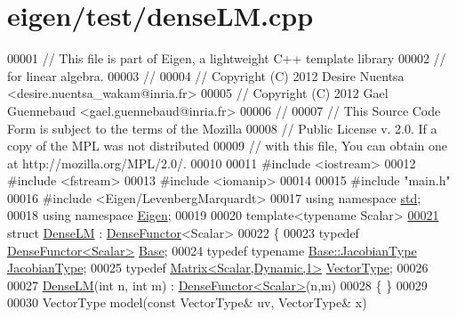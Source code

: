 \hypertarget{eigen_2test_2dense_l_m_8cpp_source}{}\section{eigen/test/dense\+LM.cpp}
\label{eigen_2test_2dense_l_m_8cpp_source}

\begin{DoxyCode}
00001 \textcolor{comment}{// This file is part of Eigen, a lightweight C++ template library}
00002 \textcolor{comment}{// for linear algebra.}
00003 \textcolor{comment}{//}
00004 \textcolor{comment}{// Copyright (C) 2012 Desire Nuentsa <desire.nuentsa\_wakam@inria.fr>}
00005 \textcolor{comment}{// Copyright (C) 2012 Gael Guennebaud <gael.guennebaud@inria.fr>}
00006 \textcolor{comment}{//}
00007 \textcolor{comment}{// This Source Code Form is subject to the terms of the Mozilla}
00008 \textcolor{comment}{// Public License v. 2.0. If a copy of the MPL was not distributed}
00009 \textcolor{comment}{// with this file, You can obtain one at http://mozilla.org/MPL/2.0/.}
00010 
00011 \textcolor{preprocessor}{#include <iostream>}
00012 \textcolor{preprocessor}{#include <fstream>}
00013 \textcolor{preprocessor}{#include <iomanip>}
00014 
00015 \textcolor{preprocessor}{#include "main.h"}
00016 \textcolor{preprocessor}{#include <Eigen/LevenbergMarquardt>}
00017 \textcolor{keyword}{using namespace }\hyperlink{namespacestd}{std};
00018 \textcolor{keyword}{using namespace }\hyperlink{namespace_eigen}{Eigen};
00019 
00020 \textcolor{keyword}{template}<\textcolor{keyword}{typename} Scalar>
\hyperlink{struct_dense_l_m}{00021} \textcolor{keyword}{struct }\hyperlink{struct_dense_l_m}{DenseLM} : \hyperlink{struct_eigen_1_1_dense_functor}{DenseFunctor}<Scalar>
00022 \{
00023   \textcolor{keyword}{typedef} \hyperlink{struct_eigen_1_1_dense_functor}{DenseFunctor<Scalar>} \hyperlink{struct_eigen_1_1_dense_functor}{Base};
00024   \textcolor{keyword}{typedef} \textcolor{keyword}{typename} \hyperlink{group___core___module_class_eigen_1_1_matrix}{Base::JacobianType} \hyperlink{group___core___module_class_eigen_1_1_matrix}{JacobianType};
00025   \textcolor{keyword}{typedef} \hyperlink{group___core___module}{Matrix<Scalar,Dynamic,1>} \hyperlink{group___core___module}{VectorType};
00026   
00027   \hyperlink{struct_dense_l_m}{DenseLM}(\textcolor{keywordtype}{int} n, \textcolor{keywordtype}{int} m) : \hyperlink{struct_eigen_1_1_dense_functor}{DenseFunctor<Scalar>}(n,m) 
00028   \{ \}
00029  
00030   VectorType model(\textcolor{keyword}{const} VectorType& uv, VectorType& x)

\end{DoxyCode}
